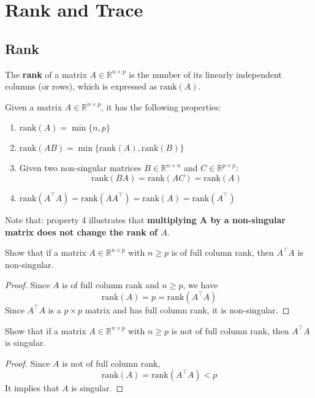 \section{Rank and Trace}
\subsection{Rank}
\begin{Def}
    The \textbf{rank} of a matrix $A\in \mathbb{R}^{n\times p}$ is the number of its linearly independent columns (or rows), which is expressed as $\text{rank}(A)$.
\end{Def}
\noindent 
Given a matrix $A\in \mathbb{R}^{n\times p}$, it has the following properties:
\begin{enumerate}
    \item $\text{rank}(A) = \min\{n, p \}$
    \item $\text{rank}(AB) = \min\{\text{rank}(A), \text{rank}(B) \}$
    \item Given two non-singular matrices $B\in\mathbb{R}^{n\times n}$ and $C\in\mathbb{R}^{p\times p}$:
    \begin{equation}
        \text{rank}(BA) = \text{rank}(AC) = \text{rank}(A)
    \end{equation}
    \item $\text{rank}(A^\top A) = \text{rank}(AA^{\top}) = \text{rank}(A) = \text{rank}(A^{\top})$
\end{enumerate}
Note that: property 4 illustrates that \textbf{multiplying A by a non-singular matrix does not change the rank of $A$}.

\begin{Ex}
    Show that if a matrix $A\in\mathbb{R}^{n\times p}$ with $n\geq p$ is of full column rank, then $A^{\top}A$ is non-singular.
\end{Ex}
\begin{proof}
    Since $A$ is of full column rank and $n\geq p$, we have
    \begin{equation*}
        \text{rank}(A) = p = \text{rank}(A^\top A)
    \end{equation*}
    Since $A^\top A$ is a $p\times p$ matrix and has full column rank, it is non-singular.
\end{proof}

\begin{Ex}
    Show that if a matrix $A\in\mathbb{R}^{n\times p}$ with $n\geq p$ is not of full column rank, then $A^{\top}A$ is singular.
\begin{proof}
    Since $A$ is not of full column rank, 
    \begin{equation*}
        \text{rank}(A) = \text{rank}(A^{\top} A) < p
    \end{equation*}
    It implies that $A$ is singular.
\end{proof}
\end{Ex}

